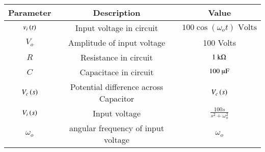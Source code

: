 \begin{tabular}{|c|c|c|}
    \hline
    \textbf{Parameter} & \textbf{Description} & \textbf{Value} \\
    \hline
    $ v_i\left(t\right)$ & Input voltage in circuit & $ 100 \cos{(\omega_o t)}\text{ Volts}$ \\
    \hline
    $ V_o$ & Amplitude of input voltage & 100 Volts\\
    \hline
    $R$ & Resistance in circuit & $ 1\text{ k\ohm}$ \\
    \hline
    $C$ & Capacitace in circuit & $ 100 \text{ \micro F}$ \\
    \hline
    $V_c\left(s\right)$ & Potential difference across Capacitor & $V_c\left(s\right)$ \\
    \hline
    $V_i\left(s\right)$ & Input voltage & $ \frac{100s}{s^2+ \omega_o^2}$\\
    \hline
    $\omega_o$ & angular frequency of input voltage& $ \omega_o$\\
    \hline
\end{tabular}



